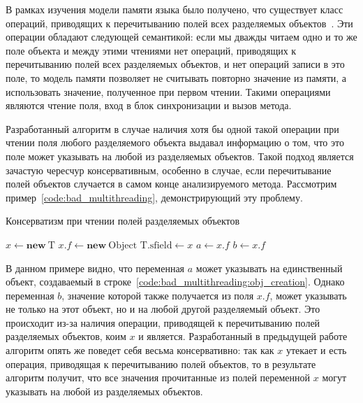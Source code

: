 \documentclass[14pt,titlepage,draft]{extarticle}
\newcommand{\java}{\eng{Java}\xspace}
\newcommand{\type}[1]{\mathrm{#1}}
\newcommand{\field}[1]{\mathrm{#1}}
\newcommand{\sfield}[2]{\type{#1}.\field{#2}}
\newcommand{\op}[1]{\mathbf{#1}}
\begin{document}
      В рамках изучения модели памяти языка \java было получено, что существует
      класс операций, приводящих к перечитыванию полей всех разделяемых
      объектов~\cite[раздел~5.3.1]{my_bachelor}. Эти операции обладают
      следующей семантикой: если мы дважды читаем одно и то же поле объекта и
      между этими чтениями нет операций, приводящих к перечитыванию полей всех
      разделяемых объектов, и нет операций записи в это поле, то модель памяти
      позволяет не считывать повторно значение из памяти, а использовать
      значение, полученное при первом чтении. Такими операциями являются
      чтение  поля, вход в блок синхронизации и вызов метода.

      Разработанный алгоритм в случае наличия хотя бы одной такой операции при
      чтении поля любого разделяемого объекта выдавал информацию о том, что это
      поле может указывать на любой из разделяемых объектов. Такой подход
      является зачастую чересчур консервативным, особенно в случае, если
      перечитывание полей объектов случается в самом конце анализируемого
      метода. Рассмотрим пример~\ref{code:bad_multithreading}, демонстрирующий
      эту проблему.

      \begin{algorithm}
        \caption{Консерватизм при чтении полей разделяемых объектов}
        \label{code:bad_multithreading}
        \begin{algorithmic}[1]
          \State $x \gets \op{new}~\type{T}$
          \State $x.f \gets \op{new}~\type{Object}$
            \label{code:bad_multithreading:obj_creation}
          \State $\sfield{T}{sfield} \gets x$
          \State $a \gets x.f$
          \State {}
          \State $b \gets x.f$
        \end{algorithmic}
      \end{algorithm}

      В данном примере видно, что переменная $a$ может указывать на
      единственный объект, создаваемый в
      строке~\ref{code:bad_multithreading:obj_creation}. Однако переменная $b$,
      значение которой также получается из поля $x.f$, может указывать не
      только на этот объект, но и на любой другой разделяемый объект. Это
      происходит из-за наличия операции, приводящей к перечитыванию полей
      разделяемых объектов, коим $x$ и является. Разработанный в предыдущей
      работе алгоритм опять же поведет себя весьма консервативно: так как $x$
      утекает и есть операция, приводящая к перечитыванию полей объектов, то
      в результате алгоритм получит, что все значения прочитанные из полей
      переменной $x$ могут указывать на любой из разделяемых объектов.
\end{document}
